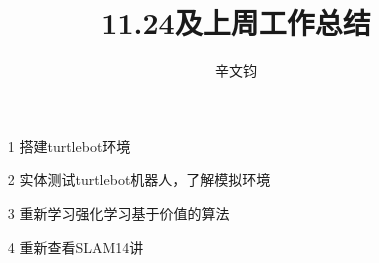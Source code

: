 \documentclass{article}
\title{11.24及上周工作总结}
\author{辛文钧}
\begin{document}
\maketitle
	\begin{itemize}
		\item[1] 搭建turtlebot环境
		\item[2] 实体测试turtlebot机器人，了解模拟环境
		\item[3] 重新学习强化学习基于价值的算法
		\item[4] 重新查看SLAM14讲
	\end{itemize}
\end{document}

